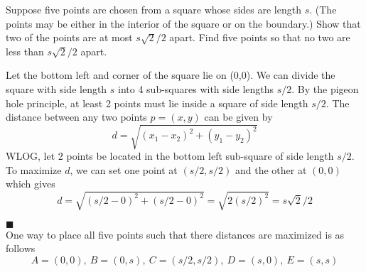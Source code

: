 \documentclass[12pt]{article}
\author{Warren Atkison}
\date{\today}
\renewcommand{\qed}{\hfill$\blacksquare$}
\renewenvironment{proof}{\vspace{1em}\begin{addmargin}[2em]{0em}\begin{newproof}}{\end{newproof}\end{addmargin}\qed}
\newenvironment{exercise}[2][Exercise]{\begin{trivlist}
\item[\hskip \labelsep {\bfseries #1} \hskip \labelsep {\bfseries #2}]}{\end{trivlist}}
\begin{document}
\fancyhf{}
\fancyhead[R]{\today}
\fancyfoot[R]{\thepage}

\begin{exercise}{1.6.6. (3pt)}
	Suppose five points are chosen from a square whose sides are length $s$. (The points may be either in the interior of the square or on the boundary.) Show that two of the points are at most $s\sqrt{2}/2$ apart. Find five points so that no two are less than $s\sqrt{2}/2$ apart. 
\end{exercise}
\begin{proof} Let the bottom left and corner of the square lie on (0,0).
	We can divide the square with side length $s$ into 4 sub-squares with side lengths $s/2$. By the pigeon hole principle, at least 2 points must lie inside a square of side length $s/2$. The distance between any two points $p = (x,y)$ can be given by
	\[
		d = \sqrt{(x_1 - x_2)^2 + (y_1 - y_2)^2}
	\]
	WLOG, let 2 points be located in the bottom left sub-square of side length $s/2$. To maximize $d$, we can set one point at $(s/2,s/2)$ and the other at $(0,0)$ which gives
	\[
		d = \sqrt{(s/2 - 0)^2 + (s/2 - 0)^2} = \sqrt{2(s/2)^2} = s\sqrt{2}/2
	\]
\end{proof} \\
One way to place all five points such that there distances are maximized is as follows 
\[
	A = (0,0),~B = (0,s),~C = (s/2,s/2),~D = (s,0),~E = (s,s)
\]
\begin{center}
\end{center}
\end{document}
